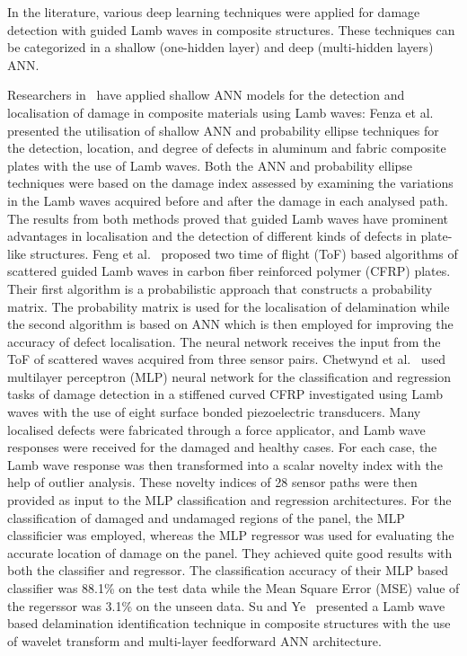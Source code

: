 In the literature, various deep learning techniques were applied for damage detection with guided Lamb waves in composite structures.
These techniques can be categorized in a shallow (one-hidden layer) and deep (multi-hidden layers) ANN.

Researchers in~\cite{de2015application, feng2019locating,chetwynd2008damage} have applied shallow ANN models for the detection and localisation of damage in composite materials using Lamb waves:
Fenza et al.~\cite{de2015application} presented the utilisation of shallow ANN and probability ellipse techniques for the detection, location, and degree of defects in aluminum and fabric composite plates with the use of Lamb waves. 
Both the ANN and probability ellipse techniques were based on the damage index assessed by examining the variations in the Lamb waves acquired before and after the damage in each analysed path. 
The results from both methods proved that guided Lamb waves have prominent advantages in localisation and the detection of different kinds of defects in plate-like structures. 
Feng et al.~\cite{feng2019locating} proposed two time of flight (ToF) based algorithms of scattered guided Lamb waves in carbon fiber reinforced polymer (CFRP) plates. 
Their first algorithm is a probabilistic approach that constructs a probability matrix. The probability matrix is used for the localisation of delamination while the second algorithm is based on ANN which is then employed for improving the accuracy of defect localisation. 
The neural network receives the input from the ToF of scattered waves acquired from three sensor pairs.
Chetwynd et al.~\cite{chetwynd2008damage} used multilayer perceptron (MLP) neural network for the classification and regression tasks of damage detection in a stiffened curved CFRP investigated using Lamb waves with the use of eight surface bonded piezoelectric transducers. 
Many localised defects were fabricated through a force applicator, and Lamb wave responses were received for the damaged and healthy cases. 
For each case, the Lamb wave response was then transformed into a scalar novelty index with the help of outlier analysis. 
These novelty indices of 28 sensor paths were then provided as input to the MLP classification and regression architectures. 
For the classification of damaged and undamaged regions of the panel, the MLP classificier was employed, whereas the MLP regressor was used for evaluating the accurate location of damage on the panel. 
They achieved quite good results with both the classifier and regressor. 
The classification accuracy of their MLP based classifier was 88.1\% on the test data while the Mean Square Error (MSE) value of the regerssor was 3.1\% on the unseen data. Su and Ye~\cite{su2004lamb} presented a Lamb wave based delamination identification technique in composite structures with the use of wavelet transform and multi-layer feedforward ANN architecture. 

